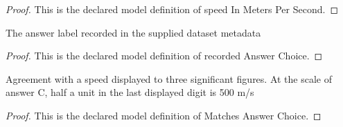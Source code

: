 \begin{proof}
  This is the declared model definition of speed In Meters Per Second.
\end{proof}
\begin{definition}
  \label{def:physics:phyx-mini-0497:phyxminiproblems-problemphyxmini0497-recordedanswerchoice}
  The answer label recorded in the supplied dataset metadata
\end{definition}
\begin{proof}
  This is the declared model definition of recorded Answer Choice.
\end{proof}
\begin{definition}
  \label{def:physics:phyx-mini-0497:phyxminiproblems-problemphyxmini0497-matchesanswerchoice}
  Agreement with a speed displayed to three significant figures. At the scale of answer C, half a unit in the last displayed digit is 500 m/s
\end{definition}
\begin{proof}
  This is the declared model definition of Matches Answer Choice.
\end{proof}
